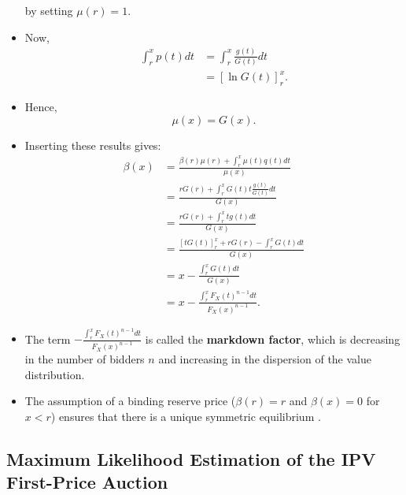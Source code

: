 \documentclass[
]{book}
\begin{document}
\begin{itemize}
\[  \]
  by setting \(\mu(r) = 1\).
\item
  Now,
  \[
  \begin{split}
  \int_{r}^x p(t) dt &= \int_{r}^x \frac{g(t)}{G(t)} dt\\
  &= [\ln G(t)]_r^x.
  \end{split}
  \]
\item
  Hence,
  \[
  \mu(x) = G(x).
  \]
\item
  Inserting these results gives:
  \[
  \begin{split}
  \beta(x) &= \frac{\beta(r)\mu(r) + \int_r^x \mu(t) q(t) dt}{\mu(x)}\\
  &= \frac{rG(r) + \int_r^x G(t) t \frac{g(t)}{G(t)} dt}{G(x)}\\
  &= \frac{rG(r) + \int_r^x t g(t) dt}{G(x)}\\
  &= \frac{[t G(t)]_r^x + rG(r) - \int_{r}^x G(t) dt }{G(x)}\\
  &= x - \frac{\int_r^x G(t) dt}{G(x)}\\
  &= x - \frac{\int_r^x F_X(t)^{n - 1} dt}{F_X(x)^{n - 1}}.
  \end{split}
  \]
\item
  The term \(- \frac{\int_r^x F_X(t)^{n - 1} dt}{F_X(x)^{n - 1}}\) is called the \textbf{markdown factor}, which is decreasing in the number of bidders \(n\) and increasing in the dispersion of the value distribution.
\item
  The assumption of a binding reserve price (\(\beta(r) = r\) and \(\beta(x) = 0\) for \(x < r\)) ensures that there is a unique symmetric equilibrium \citep{atheyChapter60Nonparametric2007}.
\end{itemize}

\hypertarget{maximum-likelihood-estimation-of-the-ipv-first-price-auction}{%
\subsection{Maximum Likelihood Estimation of the IPV First-Price Auction}\label{maximum-likelihood-estimation-of-the-ipv-first-price-auction}}
\end{document}
